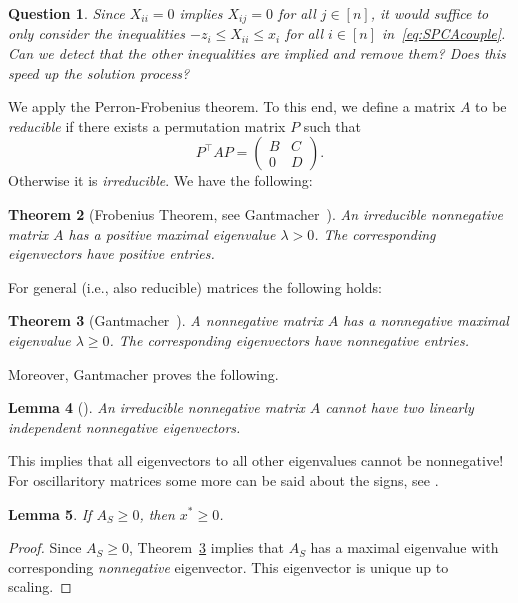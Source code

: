 \documentclass[10pt, a4paper]{article}
\newcommand{\T}{^{\top}}
\newtheorem{theorem}{Theorem}
\newtheorem{lemma}[theorem]{Lemma}
\newtheorem{question}[theorem]{Question}
\begin{document}
\begin{question}
  Since $X_{ii} = 0$ implies $X_{ij} = 0$ for all $j \in [n]$, it would
  suffice to only consider the inequalities $-z_i \leq X_{ii} \leq x_i$ for
  all $i \in [n]$ in~\eqref{eq:SPCAcouple}. Can we detect that the other
  inequalities are implied and remove them? Does this speed up the solution
  process?
\end{question}

We apply the Perron-Frobenius theorem. To this end, we define a matrix $A$ to
be \emph{reducible} if there exists a permutation matrix $P$ such that
\[
  P\T A P = \begin{pmatrix} B & C \\ 0 & D \end{pmatrix}.
\]
Otherwise it is \emph{irreducible}. We have the following:

\begin{theorem}[{Frobenius Theorem, see Gantmacher~\cite[Chapter 2, Thm.~2]{Gan59II}}]\label{thm:PerronFrobenius}
  An irreducible nonnegative matrix $A$ has a positive maximal eigenvalue
  $\lambda > 0$. The corresponding eigenvectors have positive entries.
\end{theorem}

For general (i.e., also reducible) matrices the following holds:
\begin{theorem}[{Gantmacher~\cite[Chapter 2, Thm.~3]{Gan59II}}]\label{thm:PerronFrobeniusNonnegative}
  A nonnegative matrix $A$ has a nonnegative maximal eigenvalue
  $\lambda \geq 0$. The corresponding eigenvectors have nonnegative
  entries.
\end{theorem}

Moreover, Gantmacher proves the following.
\begin{lemma}[{\cite[Chapter 2, Remark 3]{Gan59II}}]\label{lemma:PFNegative}
  An irreducible nonnegative matrix $A$ cannot have two linearly
  independent nonnegative eigenvectors.
\end{lemma}
This implies that all eigenvectors to all other eigenvalues cannot be nonnegative!
For oscillaritory matrices some more can be said about the signs, see
\cite[Chapter 2, Theorem~13]{Gan59II}.

\begin{lemma}
  If $A_S \geq 0$, then $x^* \geq 0$.
\end{lemma}

\begin{proof}
  Since $A_S \geq 0$, Theorem~\ref{thm:PerronFrobeniusNonnegative} implies
  that $A_S$ has a maximal eigenvalue with corresponding \emph{nonnegative}
  eigenvector. This eigenvector is unique up to scaling.
\end{proof}
\end{document}
